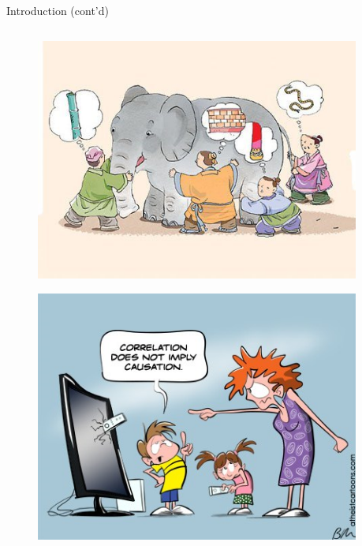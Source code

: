 \documentclass{beamer}
\begin{document}
\begin{frame}{Introduction (cont'd)}
	\begin{columns}
		\begin{column}{.38\textwidth}
			\begin{figure}[ht]
				\centering
				\includegraphics[width=1\textwidth, keepaspectratio]{img/elephant.jpg}
			\end{figure}
			\vspace{-0.5cm}
			\begin{figure}[ht]
				\centering
				\includegraphics[width=1\textwidth, keepaspectratio]{img/correlation_causation.png}
			\end{figure}
		\end{column}
		\begin{column}{.58\textwidth}


\end{column}
\end{columns}
\end{frame}
\end{document}
